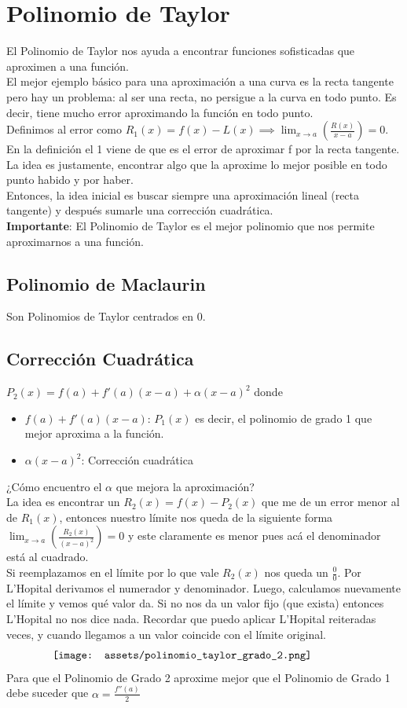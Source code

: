 \documentclass[10pt,a4paper]{article}
\begin{document}
\section*{Polinomio de Taylor}
El Polinomio de Taylor nos ayuda a encontrar funciones sofisticadas que aproximen a una función. \\
El mejor ejemplo básico para una aproximación a una curva es la recta tangente pero hay un problema: al ser una recta, no persigue a la curva en todo punto. Es decir, tiene mucho error aproximando la función en todo punto. \\
Definimos al error como $R_{1}(x) = f(x) - L(x) \implies \lim_{x \to a} \left(\frac{R(x)}{x-a}  \right) = 0 $. En la definición el 1 viene de que es el error de aproximar f por la recta tangente. \\
La idea es justamente, encontrar algo que la aproxime lo mejor posible en todo punto habido y por haber. \\
Entonces, la idea inicial es buscar siempre una aproximación lineal (recta tangente) y después sumarle una corrección cuadrática. \\
\textbf{Importante}: El Polinomio de Taylor es el mejor polinomio que nos permite aproximarnos a una función.
\subsection*{Polinomio de Maclaurin}
Son Polinomios de Taylor centrados en 0.
\subsection*{Corrección Cuadrática}
$P_{2}(x) = f(a) + f'(a)(x-a) + \alpha(x-a)^{2}$
donde 
\begin{itemize}
    \item $f(a) + f'(a)(x-a)$: $P_{1}(x)$ es decir, el polinomio de grado 1 que mejor aproxima a la función.
    \item $\alpha(x-a)^{2}$: Corrección cuadrática
\end{itemize}
¿Cómo encuentro el $\alpha$ que mejora la aproximación? \\
La idea es encontrar un $R_{2}(x) = f(x) - P_{2}(x)$ que me de un error menor al de $R_{1}(x)$, entonces nuestro límite nos queda de la siguiente forma $\lim_{x \to a} \left(\frac{R_{2}(x)}{(x-a)^{2}}  \right) = 0$ y este claramente es menor pues acá el denominador está al cuadrado. \\
Si reemplazamos en el límite por lo que vale $R_{2}(x)$ nos queda un $\frac{0}{0}$. Por L'Hopital derivamos el numerador y denominador. Luego, calculamos nuevamente el límite y vemos qué valor da. Si no nos da un valor fijo (que exista) entonces L'Hopital no nos dice nada. Recordar que puedo aplicar L'Hopital reiteradas veces, y cuando llegamos a un valor coincide con el límite original.
\[\begin{minipage}[b]{0.8\textwidth}
    \texttt{[image: assets/polinomio\_taylor\_grado\_2.png]}
\end{minipage}\]
Para que el Polinomio de Grado 2 aproxime mejor que el Polinomio de Grado 1 debe suceder que $\alpha = \frac{f''(a)}{2}$
\end{document}
